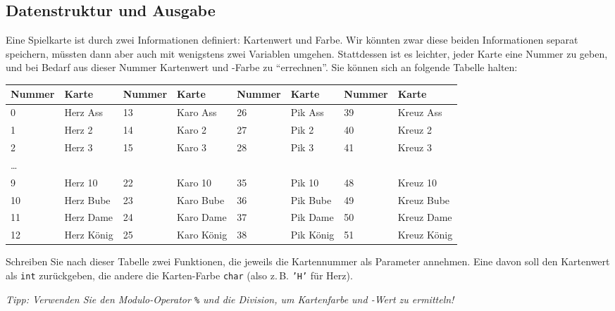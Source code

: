 \documentclass[
	ngerman,
	fontsize=10pt,
	parskip=half,
	titlepage=true,
	DIV=12
]{scrartcl}
\begin{document}
{\subsection{Datenstruktur und Ausgabe}
Eine Spielkarte ist durch zwei Informationen definiert: Kartenwert und Farbe. Wir könnten zwar diese beiden Informationen separat speichern, müssten dann aber auch mit wenigstens zwei Variablen umgehen. Stattdessen ist es leichter, jeder Karte eine Nummer zu geben, und bei Bedarf aus dieser Nummer Kartenwert und -Farbe zu \enquote{errechnen}. Sie können sich an folgende Tabelle halten:

\begin{center}
\begin{tabular}{ll|ll|ll|ll}
	\textbf{Nummer} & \textbf{Karte} &
	\textbf{Nummer} & \textbf{Karte} &
	\textbf{Nummer} & \textbf{Karte} &
	\textbf{Nummer} & \textbf{Karte} \\\hline
	
	 0 & Herz  Ass &
	13 & Karo  Ass &
	26 & Pik   Ass &
	39 & Kreuz Ass \\
	
	 1 & Herz  2 &
	14 & Karo  2 &
	27 & Pik   2 &
	40 & Kreuz 2 \\
	
	 2 & Herz  3 &
	15 & Karo  3 &
	28 & Pik   3 &
	41 & Kreuz 3 \\
	
	\ldots \\
	
	 9 & Herz  10 &
	22 & Karo  10 &
	35 & Pik   10 &
	48 & Kreuz 10 \\
	
	10 & Herz  Bube &
	23 & Karo  Bube &
	36 & Pik   Bube &
	49 & Kreuz Bube \\
	
	11 & Herz  Dame &
	24 & Karo  Dame &
	37 & Pik   Dame &
	50 & Kreuz Dame \\
	
	12 & Herz  König &
	25 & Karo  König &
	38 & Pik   König &
	51 & Kreuz König \\
\end{tabular}
\end{center}

Schreiben Sie nach dieser Tabelle zwei Funktionen, die jeweils die Kartennummer als Parameter annehmen. Eine davon soll den Kartenwert als \texttt{int} zurückgeben, die andere die Karten-Farbe \texttt{char} (also z.\,B. \texttt{'H'} für Herz).

\emph{Tipp: Verwenden Sie den Modulo-Operator \texttt{\%} und die Division, um Kartenfarbe und -Wert zu ermitteln!}

}
\end{document}
